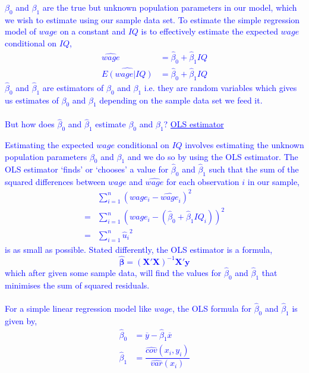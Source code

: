 \documentclass[12pt]{report}
\newenvironment{blueframed}[1][blue]
{\def\FrameCommand{\fboxsep=\FrameSep\fcolorbox{#1}{white}}%
\MakeFramed {\advance\hsize-\width \FrameRestore}}
{\endMakeFramed}
\begin{document}
\begin{blueframed}
	\noindent \textcolor{blue}
	{
	$\beta_0$ and $\beta_1$ are the true but unknown population parameters in our model, which we wish to estimate using our sample data set. To estimate the simple regression model of $wage$ on a constant and $IQ$ is to effectively estimate the expected $wage$ conditional on $IQ$,
	\begin{align*}
		\widehat{wage} &= \hat{\beta}_0+\hat{\beta}_1IQ \\
		\widehat{E(wage|IQ)} &= \hat{\beta}_0+\hat{\beta}_1IQ
	\end{align*}
	$\hat{\beta}_0$ and $\hat{\beta}_1$ are estimators of $\beta_0$ and $\beta_1$ i.e. they are random variables which gives us estimates of $\beta_0$ and $\beta_1$ depending on the sample data set we feed it. \\ \\ But how does $\hat{\beta}_0$ and $\hat{\beta}_1$ estimate $\beta_0$ and $\beta_1$?
	}
	\justify
	\textcolor{blue}{\underline{OLS estimator}}

	\noindent \textcolor{blue}
	{
	Estimating the expected $wage$ conditional on $IQ$ involves estimating the unknown population parameters $\beta_0$ and $\beta_1$ and we do so by using the OLS estimator. The OLS estimator ‘finds’ or ‘chooses’ a value for $\hat{\beta}_0$ and $\hat{\beta}_1$ such that the sum of the squared differences between $wage$ and $\widehat{wage}$ for each observation $i$ in our sample,
	\begin{align*}
	&\sum_{i=1}^{n} (wage_i - \widehat{wage}_i)^2 \\
	=&\sum_{i=1}^{n} (wage_i - (\hat{\beta}_0+\hat{\beta}_1IQ_i))^2 \\
	=&\sum_{i=1}^{n} {\hat{u}_i}^2
	\end{align*}
	is as small as possible.
	Stated differently, the OLS estimator is a formula, $$\widehat{\boldsymbol{\beta}} =(\textbf{X}'\textbf{X})^{-1}\textbf{X}'\textbf{y}$$
	which after given some sample data, will find the values for $\hat{\beta}_0$ and $\hat{\beta}_1$ that minimises the sum of squared residuals. \\ \\
	For a simple linear regression model like $wage$, the OLS formula for $\hat{\beta}_0$ and $\hat{\beta}_1$ is given by, \begin{align*}
		\hat{\beta}_0 &= \overline{y} - \hat{\beta}_1 \overline{x} \\
		\hat{\beta}_1 &= \dfrac{\widehat{cov}(x_i , y_i)}{\widehat{var}(x_i)}
	\end{align*}
	}
\end{blueframed}
\end{document}
